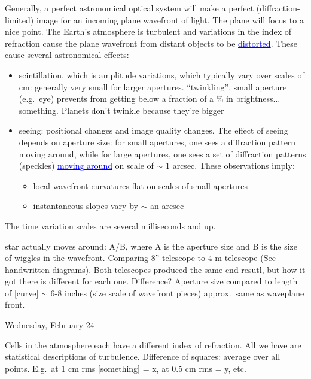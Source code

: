 \documentclass[12pt]{article}
\begin{document}
Generally, a perfect astronomical optical system will make a perfect
(diffraction-limited) image for an incoming plane wavefront of light.
The plane will focus to a nice point.
The Earth's atmosphere is turbulent and variations in the index of
refraction cause the plane wavefront from distant objects to be
\href{http://astronomy.nmsu.edu/holtz/a535/html/diagrams/a535/seeing.htm}
{\textcolor{blue}{distorted}}.
These cause several astronomical effects:
\begin{itemize}
    \item scintillation, which is amplitude variations, which
        typically vary over scales of cm: generally very small for larger
        apertures. \textcolor{myBlue}{``twinkling'', small aperture
        (e.g.\ eye) prevents from getting below a fraction of a \% in
        brightness$\ldots$ something. Planets don't twinkle because they're
        bigger}
    \item seeing: positional changes and image quality
        changes. The effect of seeing depends on aperture size: for small
        apertures, one sees a diffraction pattern moving around, while for
        large apertures, one sees a set of diffraction patterns (speckles)
        \href{https://en.wikipedia.org/wiki/Speckle_imaging#/media/File:Eps_aql_movie_not_2000.gif}
        {\textcolor{blue}{moving around}}
        on scale of $\sim$ 1 arcsec. These observations
        imply:
        \begin{itemize}
            \item local wavefront curvatures flat on scales of small apertures
            \item instantaneous slopes vary by $\sim$ an arcsec
        \end{itemize}
\end{itemize}
The time variation scales are
\textcolor{myGreen}{several milliseconds} and up.

\textcolor{myBlue}{star actually moves around: A/B, where A is the aperture
size and B is the size of wiggles in the wavefront. Comparing 8'' telescope
to 4-m telescope (See handwritten diagrams).
Both telescopes produced the same end resutl, but how it got there is different
for each one. Difference? Aperture size compared to length of [curve] $\sim$
6-8 inches (size scale of wavefront pieces) approx.\ same as waveplane front.}



\textcolor{date}{Wednesday, February 24}

\textcolor{myBlue}{Cells in the atmosphere each have a different
index of refraction. All we have are statistical descriptions of
turbulence. Difference of squares: average over all points.
E.g.\ at 1 cm rms [something] = x, at 0.5 cm rms = y, etc.}
\end{document}
